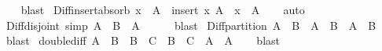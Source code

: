 \begin{isabellebody}
%
\isadelimproof
\ \ %
\endisadelimproof
%
\isatagproof
{}\isamarkupfalse%
\ blast%
\endisatagproof
{\isafoldproof}%
%
\isadelimproof
\isanewline
%
\endisadelimproof
\isanewline
{}\isamarkupfalse%
\ Diff{\isacharunderscore}{\kern0pt}insert{\isacharunderscore}{\kern0pt}absorb{\isacharcolon}{\kern0pt}\ {\isachardoublequoteopen}x\ {\isasymnotin}\ A\ {\isasymLongrightarrow}\ {\isacharparenleft}{\kern0pt}insert\ x\ A{\isacharparenright}{\kern0pt}\ {\isacharminus}{\kern0pt}\ {\isacharbraceleft}{\kern0pt}x{\isacharbraceright}{\kern0pt}\ {\isacharequal}{\kern0pt}\ A{\isachardoublequoteclose}\isanewline
%
\isadelimproof
\ \ %
\endisadelimproof
%
\isatagproof
{}\isamarkupfalse%
\ auto%
\endisatagproof
{\isafoldproof}%
%
\isadelimproof
\isanewline
%
\endisadelimproof
\isanewline
{}\isamarkupfalse%
\ Diff{\isacharunderscore}{\kern0pt}disjoint\ {\isacharbrackleft}{\kern0pt}simp{\isacharbrackright}{\kern0pt}{\isacharcolon}{\kern0pt}\ {\isachardoublequoteopen}A\ {\isasyminter}\ {\isacharparenleft}{\kern0pt}B\ {\isacharminus}{\kern0pt}\ A{\isacharparenright}{\kern0pt}\ {\isacharequal}{\kern0pt}\ {\isacharbraceleft}{\kern0pt}{\isacharbraceright}{\kern0pt}{\isachardoublequoteclose}\isanewline
%
\isadelimproof
\ \ %
\endisadelimproof
%
\isatagproof
{}\isamarkupfalse%
\ blast%
\endisatagproof
{\isafoldproof}%
%
\isadelimproof
\isanewline
%
\endisadelimproof
\isanewline
{}\isamarkupfalse%
\ Diff{\isacharunderscore}{\kern0pt}partition{\isacharcolon}{\kern0pt}\ {\isachardoublequoteopen}A\ {\isasymsubseteq}\ B\ {\isasymLongrightarrow}\ A\ {\isasymunion}\ {\isacharparenleft}{\kern0pt}B\ {\isacharminus}{\kern0pt}\ A{\isacharparenright}{\kern0pt}\ {\isacharequal}{\kern0pt}\ B{\isachardoublequoteclose}\isanewline
%
\isadelimproof
\ \ %
\endisadelimproof
%
\isatagproof
{}\isamarkupfalse%
\ blast%
\endisatagproof
{\isafoldproof}%
%
\isadelimproof
\isanewline
%
\endisadelimproof
\isanewline
{}\isamarkupfalse%
\ double{\isacharunderscore}{\kern0pt}diff{\isacharcolon}{\kern0pt}\ {\isachardoublequoteopen}A\ {\isasymsubseteq}\ B\ {\isasymLongrightarrow}\ B\ {\isasymsubseteq}\ C\ {\isasymLongrightarrow}\ B\ {\isacharminus}{\kern0pt}\ {\isacharparenleft}{\kern0pt}C\ {\isacharminus}{\kern0pt}\ A{\isacharparenright}{\kern0pt}\ {\isacharequal}{\kern0pt}\ A{\isachardoublequoteclose}\isanewline
%
\isadelimproof
\ \ %
\endisadelimproof
%
\isatagproof
{}\isamarkupfalse%
\ blast%
\endisatagproof
{\isafoldproof}%
%
\isadelimproof
\isanewline
%
\endisadelimproof
\isanewline

\end{isabellebody}
